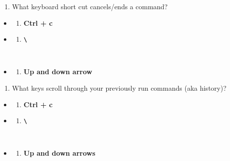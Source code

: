 \documentclass[
  letterpaper,
  DIV=11,
  numbers=noendperiod]{scrreprt}
\providecommand{\tightlist}{%
  \setlength{\itemsep}{0pt}\setlength{\parskip}{0pt}}\usepackage{longtable,booktabs,array}
\begin{document}
\begin{enumerate}
\def\labelenumi{\arabic{enumi}.}
\setcounter{enumi}{3}
\tightlist
\item
  What keyboard short cut cancels/ends a command?
\end{enumerate}

\begin{itemize}
\item
  \begin{enumerate}
  \def\labelenumi{(\Alph{enumi})}
  \tightlist
  \item
    \textbf{Ctrl + c}\\
  \end{enumerate}
\item
  \begin{enumerate}
  \def\labelenumi{(\Alph{enumi})}
  \setcounter{enumi}{1}
  \tightlist
  \item
    \textbf{\texttt{\textbackslash{}}}\strut \\
  \end{enumerate}
\item
  \begin{enumerate}
  \def\labelenumi{(\Alph{enumi})}
  \setcounter{enumi}{2}
  \tightlist
  \item
    \textbf{Up and down arrow}
  \end{enumerate}
\end{itemize}

\begin{enumerate}
\def\labelenumi{\arabic{enumi}.}
\setcounter{enumi}{4}
\tightlist
\item
  What keys scroll through your previously run commands (aka history)?
\end{enumerate}

\begin{itemize}
\item
  \begin{enumerate}
  \def\labelenumi{(\Alph{enumi})}
  \tightlist
  \item
    \textbf{Ctrl + c}\\
  \end{enumerate}
\item
  \begin{enumerate}
  \def\labelenumi{(\Alph{enumi})}
  \setcounter{enumi}{1}
  \tightlist
  \item
    \textbf{\texttt{\textbackslash{}}}\strut \\
  \end{enumerate}
\item
  \begin{enumerate}
  \def\labelenumi{(\Alph{enumi})}
  \setcounter{enumi}{2}
  \tightlist
  \item
    \textbf{Up and down arrows}
  \end{enumerate}
\end{itemize}
\end{document}
